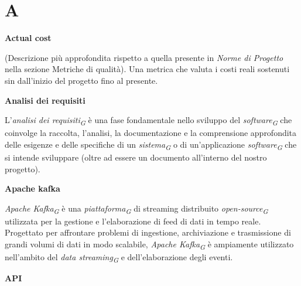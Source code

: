 \documentclass{article}
\begin{document}
\section*{A}
{}

\vspace{0.4cm}

\textbf{Actual cost}

\vspace{0.1cm}

(Descrizione più approfondita rispetto a quella presente in \textit{Norme di Progetto} nella sezione Metriche di qualità). Una metrica che valuta i costi reali sostenuti sin dall'inizio del progetto fino al presente.

\vspace{0.4cm}

\textbf{Analisi dei requisiti}

\vspace{0.1cm}

L'\textit{analisi dei requisiti}\textsubscript{\textit{G}} è una fase fondamentale nello sviluppo del \textit{software}\textsubscript{\textit{G}} che coinvolge la raccolta, l'analisi, la documentazione e la comprensione approfondita delle esigenze e delle specifiche di un \textit{sistema}\textsubscript{\textit{G}} o di un'applicazione \textit{software}\textsubscript{\textit{G}} che si intende sviluppare (oltre ad essere un documento all’interno del nostro progetto).

\vspace{0.4cm}

\textbf{Apache kafka}

\vspace{0.1cm}

\textit{Apache Kafka}\textsubscript{\textit{G}} è una \textit{piattaforma}\textsubscript{\textit{G}} di streaming distribuito \textit{open-source}\textsubscript{\textit{G}} utilizzata per la gestione e l'elaborazione di feed di dati in tempo reale. Progettato per affrontare problemi di ingestione, archiviazione e trasmissione di grandi volumi di dati in modo scalabile, \textit{Apache Kafka}\textsubscript{\textit{G}} è ampiamente utilizzato nell'ambito del \textit{data streaming}\textsubscript{\textit{G}} e dell'elaborazione degli eventi.

\vspace{0.4cm}

\textbf{API}
\end{document}
